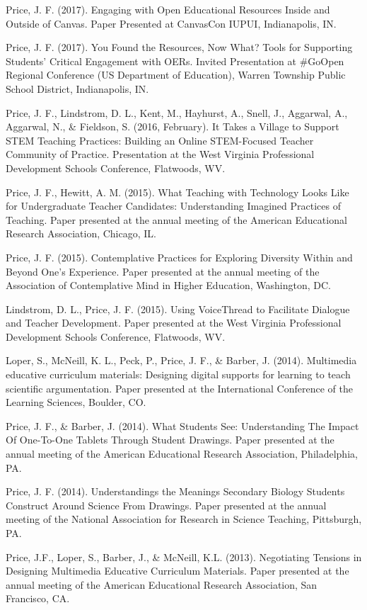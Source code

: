 \documentclass[11pt,article,oneside]{memoir}
\begin{document}
\ind Price, J. F. (2017). Engaging with Open Educational Resources Inside and Outside of Canvas. Paper Presented at CanvasCon IUPUI, Indianapolis, IN.

\ind Price, J. F. (2017). You Found the Resources, Now What? Tools for Supporting Students’ Critical Engagement with OERs. Invited Presentation at \#GoOpen Regional Conference (US Department of Education), Warren Township Public School District, Indianapolis, IN.

\ind Price, J. F., Lindstrom, D. L., Kent, M., Hayhurst, A., Snell, J., Aggarwal, A., Aggarwal, N., \& Fieldson, S. (2016, February). It Takes a Village to Support STEM Teaching Practices: Building an Online STEM-Focused Teacher Community of Practice. Presentation at the West Virginia Professional Development Schools Conference, Flatwoods, WV.

\ind Price, J. F., Hewitt, A. M. (2015). What Teaching with Technology Looks Like for Undergraduate Teacher Candidates: Understanding Imagined Practices of Teaching. Paper presented at the annual meeting of the American Educational Research Association, Chicago, IL.

\ind Price, J. F. (2015). Contemplative Practices for Exploring Diversity Within and Beyond One’s Experience. Paper presented at the annual meeting of the Association of Contemplative Mind in Higher Education, Washington, DC.

\ind Lindstrom, D. L., Price, J. F. (2015). Using VoiceThread to Facilitate Dialogue and Teacher Development. Paper presented at the West Virginia Professional Development Schools Conference, Flatwoods, WV.

\ind Loper, S., McNeill, K. L., Peck, P., Price, J. F., \& Barber, J. (2014). Multimedia educative curriculum materials: Designing digital supports for learning to teach scientific argumentation. Paper presented at the International Conference of the Learning Sciences, Boulder, CO.

\ind Price, J. F., \& Barber, J. (2014). What Students See: Understanding The Impact Of One-To-One Tablets Through Student Drawings. Paper presented at the annual meeting of the American Educational Research Association, Philadelphia, PA.

\ind Price, J. F. (2014). Understandings the Meanings Secondary Biology Students Construct Around Science From Drawings. Paper presented at the annual meeting of the National Association for Research in Science Teaching, Pittsburgh, PA.

\ind Price, J.F., Loper, S., Barber, J., \& McNeill, K.L. (2013). Negotiating Tensions in Designing Multimedia Educative Curriculum Materials. Paper presented at the annual meeting of the American Educational Research Association, San Francisco, CA. 
\end{document}
